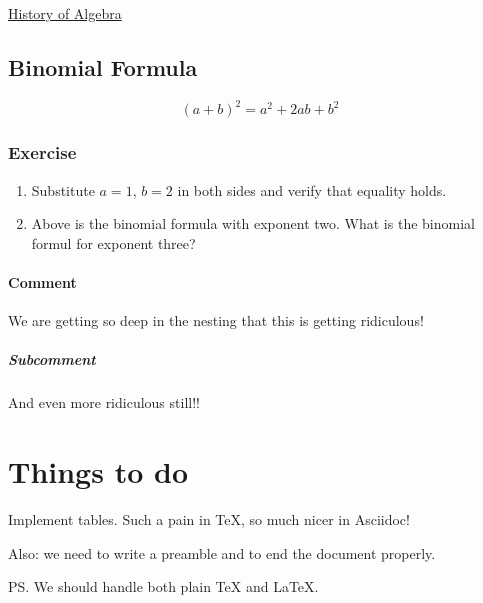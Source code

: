 \documentclass[11pt]{amsart}
\begin{document}
\href{http://en.wikipedia.org/wiki/History_of_algebra}{History of Algebra}




\subsection{Binomial Formula}

\[
 (a + b)^2 = a^2 + 2ab + b^2
\]


\subsubsection{Exercise}

\begin{enumerate}

\item Substitute $a = 1$, $b = 2$ in both sides
and verify that equality holds.

\item Above is the binomial formula with exponent two.
What is the binomial formul for exponent three?

\end{enumerate}


\paragraph{Comment}

We are getting so deep in the nesting that this
is getting ridiculous!


\subparagraph{Subcomment}

And even more ridiculous still!!












\section{Things to do}

Implement tables.  Such a pain in TeX, so much nicer in Asciidoc!


Also: we need to write a preamble and to
end the document properly.


PS.  We should handle both plain TeX and LaTeX.
\end{document}
